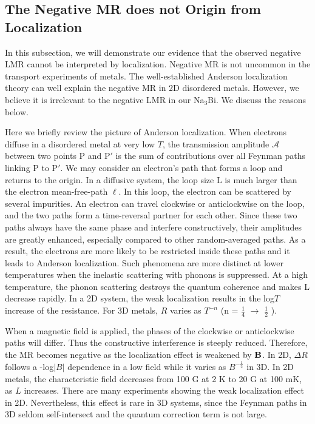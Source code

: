 \subsection{The Negative MR does not Origin from Localization}

In this subsection, we will demonstrate our evidence that the observed negative LMR cannot be interpreted by localization. Negative MR is not uncommon in the transport experiments of metals. The well-established Anderson localization theory can well explain the negative MR in 2D disordered metals. However, we believe it is irrelevant to the negative LMR in our Na$_3$Bi. We discuss the reasons below.

Here we briefly review the picture of Anderson localization. When electrons diffuse in a disordered metal at very low $T$, the transmission amplitude $\mathcal{A}$ between two points P and P$'$ is the sum of contributions over all Feynman paths linking P to P$'$. We may consider an electron's path that forms a loop and returns to the origin. In a diffusive system, the loop size L is much larger than the electron mean-free-path $\ell$. In this loop, the electron can be scattered by several impurities. An electron can travel clockwise or anticlockwise on the loop, and the two paths form a time-reversal partner for each other. Since these two paths always have the same phase and interfere constructively, their amplitudes are greatly enhanced, especially compared to other random-averaged paths. As a result, the electrons are more likely to be restricted inside these paths and it leads to Anderson localization. Such phenomena are more distinct at lower temperatures when the inelastic scattering with phonons is suppressed. At a high temperature, the phonon scattering destroys the quantum coherence and makes L decrease rapidly. In a 2D system, the weak localization results in the log$T$ increase of the resistance. For 3D metals, $R$ varies as $T^{-n}$ (n = $\frac14$ $\to$ $\frac12$ ).

When a magnetic field is applied, the phases of the clockwise or anticlockwise paths will differ. Thus the constructive interference is steeply reduced. Therefore, the MR becomes negative as the localization effect is weakened by $\bf B$. In 2D, $\Delta R$ follows a -log$|B|$ dependence in a low field while it varies as $B^{-\frac12}$ in 3D. In 2D metals, the characteristic field decreases from 100 G at 2 K to 20 G at 100 mK, as $L$ increases. There are many experiments showing the weak localization effect in 2D. Nevertheless, this effect is rare in 3D systems, since the Feynman paths in 3D seldom self-intersect and the quantum correction term is not large.

